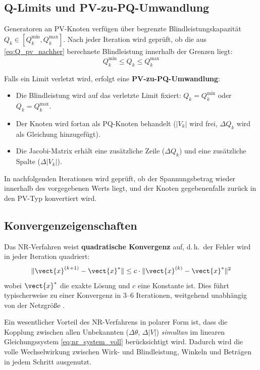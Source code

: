 \subsection{Q-Limits und PV-zu-PQ-Umwandlung}
\label{subsec:nrq_limits}

Generatoren an PV-Knoten verfügen über begrenzte Blindleistungskapazität $Q_k \in [Q_k^{\min}, Q_k^{\max}]$. Nach jeder Iteration wird geprüft, ob die aus \eqref{eq:Q_pv_nachher} berechnete Blindleistung innerhalb der Grenzen liegt:
\begin{equation}
	Q_k^{\min} \leq Q_k \leq Q_k^{\max}
	\label{eq:q_limits}
\end{equation}

Falls ein Limit verletzt wird, erfolgt eine \textbf{PV-zu-PQ-Umwandlung}:
\begin{itemize}
	\item Die Blindleistung wird auf das verletzte Limit fixiert: $Q_k = Q_k^{\min}$ oder $Q_k = Q_k^{\max}$.
	\item Der Knoten wird fortan als PQ-Knoten behandelt ($|V_k|$ wird frei, $\Delta Q_k$ wird als Gleichung hinzugefügt).
	\item Die Jacobi-Matrix erhält eine zusätzliche Zeile ($\Delta Q_k$) und eine zusätzliche Spalte ($\Delta|V_k|$).
\end{itemize}

In nachfolgenden Iterationen wird geprüft, ob der Spannungsbetrag wieder innerhalb des vorgegebenen Werts liegt, und der Knoten gegebenenfalls zurück in den PV-Typ konvertiert wird.

\subsection{Konvergenzeigenschaften}
\label{subsec:nr_konvergenz}

Das NR-Verfahren weist \textbf{quadratische Konvergenz} auf, d.\,h.\ der Fehler wird in jeder Iteration quadriert:
\begin{equation}
	\|\vect{x}^{(k+1)} - \vect{x}^*\| \leq c \cdot \|\vect{x}^{(k)} - \vect{x}^*\|^2
	\label{eq:quadratische_konvergenz}
\end{equation}
wobei $\vect{x}^*$ die exakte Lösung und $c$ eine Konstante ist. Dies führt typischerweise zu einer Konvergenz in 3--6 Iterationen, weitgehend unabhängig von der Netzgröße \cite{Grainger1994}.

Ein wesentlicher Vorteil des NR-Verfahrens in polarer Form ist, dass die Kopplung zwischen allen Unbekannten ($\Delta\theta$, $\Delta|V|$) \textit{simultan} im linearen Gleichungssystem \eqref{eq:nr_system_voll} berücksichtigt wird. Dadurch wird die volle Wechselwirkung zwischen Wirk- und Blindleistung, Winkeln und Beträgen in jedem Schritt ausgenutzt.

